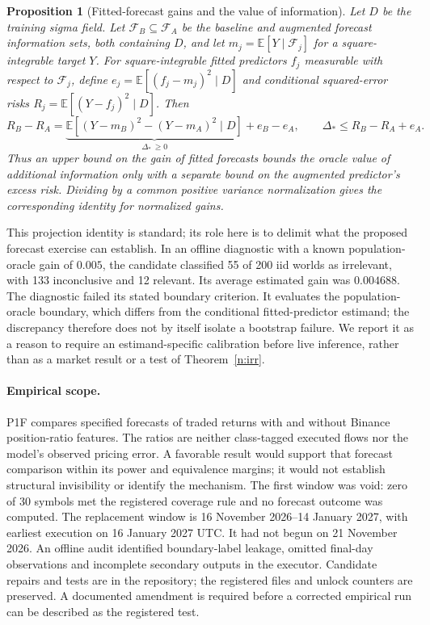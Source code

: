 \documentclass[12pt]{article}
\newtheorem{proposition}[theorem]{Proposition}
\theoremstyle{definition}
\theoremstyle{remark}
\begin{document}
\begin{proposition}[Fitted-forecast gains and the value of information]\label{n:learnergap}
Let $D$ be the training sigma field. Let $\mathcal F_B\subseteq\mathcal F_A$ be the baseline and augmented forecast information sets, both containing $D$, and let $m_j=\mathbb E[Y\mid\mathcal F_j]$ for a square-integrable target $Y$. For square-integrable fitted predictors $f_j$ measurable with respect to $\mathcal F_j$, define $e_j=\mathbb E[(f_j-m_j)^2\mid D]$ and conditional squared-error risks $R_j=\mathbb E[(Y-f_j)^2\mid D]$. Then
\[
R_B-R_A=\underbrace{\mathbb E[(Y-m_B)^2-(Y-m_A)^2\mid D]}_{\Delta_*\,\ge0}
+e_B-e_A,
\qquad \Delta_*\le R_B-R_A+e_A.
\]
Thus an upper bound on the gain of fitted forecasts bounds the oracle value of additional information only with a separate bound on the augmented predictor's excess risk. Dividing by a common positive variance normalization gives the corresponding identity for normalized gains.
\end{proposition}

This projection identity is standard; its role here is to delimit what the proposed forecast exercise can establish. In an offline diagnostic with a known population-oracle gain of $0.005$, the candidate classified 55 of 200 iid worlds as irrelevant, with 133 inconclusive and 12 relevant. Its average estimated gain was $0.004688$. The diagnostic failed its stated boundary criterion. It evaluates the population-oracle boundary, which differs from the conditional fitted-predictor estimand; the discrepancy therefore does not by itself isolate a bootstrap failure. We report it as a reason to require an estimand-specific calibration before live inference, rather than as a market result or a test of Theorem~\ref{n:irr}.

\paragraph{Empirical scope.} P1F compares specified forecasts of traded returns with and without Binance position-ratio features. The ratios are neither class-tagged executed flows nor the model's observed pricing error. A favorable result would support that forecast comparison within its power and equivalence margins; it would not establish structural invisibility or identify the mechanism. The first window was void: zero of 30 symbols met the registered coverage rule and no forecast outcome was computed. The replacement window is 16 November 2026--14 January 2027, with earliest execution on 16 January 2027 UTC. It had not begun on 21 November 2026. An offline audit identified boundary-label leakage, omitted final-day observations and incomplete secondary outputs in the executor. Candidate repairs and tests are in the repository; the registered files and unlock counters are preserved. A documented amendment is required before a corrected empirical run can be described as the registered test.
\end{document}
